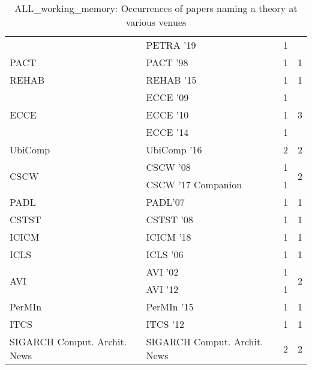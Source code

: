 \begin{table*}[t]
\begin{tabular}{llrr}
& PETRA '19 & 1 &\\
\multirow{1}{*}{PACT } & PACT '98 & 1 & \multirow{1}{*}{1}\\
\multirow{1}{*}{REHAB } & REHAB '15 & 1 & \multirow{1}{*}{1}\\
\multirow{3}{*}{ECCE } & ECCE '09 & 1 & \multirow{3}{*}{3}\\
& ECCE '10 & 1 &\\
& ECCE '14 & 1 &\\
\multirow{1}{*}{UbiComp } & UbiComp '16 & 2 & \multirow{1}{*}{2}\\
\multirow{2}{*}{CSCW } & CSCW '08 & 1 & \multirow{2}{*}{2}\\
& CSCW '17 Companion & 1 &\\
\multirow{1}{*}{PADL} & PADL'07 & 1 & \multirow{1}{*}{1}\\
\multirow{1}{*}{CSTST } & CSTST '08 & 1 & \multirow{1}{*}{1}\\
\multirow{1}{*}{ICICM } & ICICM '18 & 1 & \multirow{1}{*}{1}\\
\multirow{1}{*}{ICLS } & ICLS '06 & 1 & \multirow{1}{*}{1}\\
\multirow{2}{*}{AVI } & AVI '02 & 1 & \multirow{2}{*}{2}\\
& AVI '12 & 1 &\\
\multirow{1}{*}{PerMIn } & PerMIn '15 & 1 & \multirow{1}{*}{1}\\
\multirow{1}{*}{ITCS } & ITCS '12 & 1 & \multirow{1}{*}{1}\\
\multirow{1}{*}{SIGARCH Comput. Archit. News} & SIGARCH Comput. Archit. News & 2 & \multirow{1}{*}{2}\\
\end{tabular}
\caption{ALL\_working\_memory: Occurrences of papers naming a theory at various venues}
\end{table*}